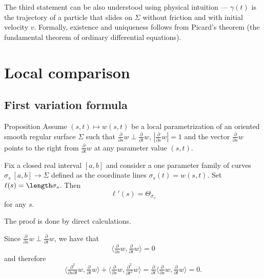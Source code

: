 The third statement can be also understood using physical intuition --- $\gamma(t)$ is the trajectory of a particle that slides on $\Sigma$ without friction and with initial velocity $v$.
Formally, existence and uniqueness follows from Picard's theorem (the  fundamental theorem of ordinary differential equations).
\qeds




























\chapter{Local comparison}

\section{First variation formula}

\begin{thm}{Proposition}\label{prop:first-var}
Assume $(s,t)\mapsto w(s,t)$ be a local parametrization of an oriented smooth regular surface $\Sigma$ such that 
$\tfrac{\partial}{\partial s}w\perp \tfrac{\partial}{\partial t}w$, $|\tfrac{\partial}{\partial s}w|=1$ and the vector $\tfrac{\partial}{\partial s}w$ points to the right from $\tfrac{\partial}{\partial t}w$ at any parameter value $(s,t)$.

Fix a closed real interval $[a,b]$ and consider a one parameter family of curves $\sigma_s\:[a,b]\to \Sigma$  defined as the coordinate lines $\sigma_s(t)=w(s,t)$.
Set $\ell(s)=\length \sigma_s$.
Then
\[\ell'(s)=\Theta_{\sigma_s}\]
for any $s$.
\end{thm}

The proof is done by direct calculations.

Since $\tfrac{\partial}{\partial s}w\perp \tfrac{\partial}{\partial t}w$, we have that
\[\langle\tfrac{\partial}{\partial s}w, \tfrac{\partial}{\partial t}w\rangle=0\]
and therefore
\[\langle\tfrac{\partial^2}{\partial s\partial t}w, \tfrac{\partial}{\partial t}w\rangle
+\langle\tfrac{\partial}{\partial s}w, \tfrac{\partial^2}{\partial t^2}w\rangle=\tfrac{\partial}{\partial t}\langle\tfrac{\partial}{\partial s}w, \tfrac{\partial}{\partial t}w\rangle=0.\]

